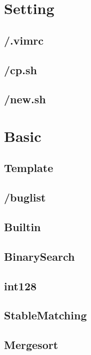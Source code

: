 \section{Setting}

\subsection{/.vimrc}

\subsection{/cp.sh}

\subsection{/new.sh}


\section{Basic}

\subsection{Template}

\subsection{/buglist}

\subsection{Builtin}

\subsection{BinarySearch}

\subsection{int128}

\subsection{StableMatching}

\subsection{Mergesort}

